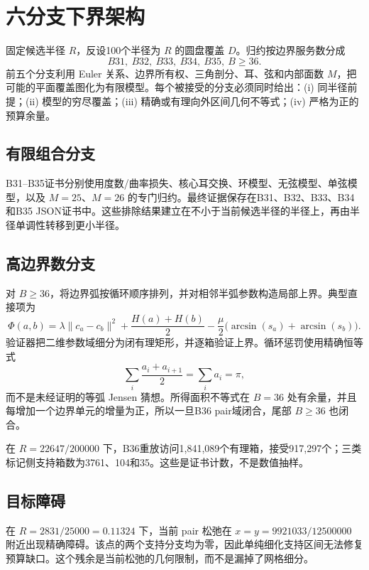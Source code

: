 \section{六分支下界架构}
固定候选半径 $R$，反设100个半径为 $R$ 的圆盘覆盖 $D$。归约按边界服务数分成
\[
B31,\ B32,\ B33,\ B34,\ B35,\ B\ge36.
\]
前五个分支利用 Euler 关系、边界所有权、三角剖分、耳、弦和内部面数 $M$，把可能的平面覆盖图化为有限模型。每个被接受的分支必须同时给出：(i) 同半径前提；(ii) 模型的穷尽覆盖；(iii) 精确或有理向外区间几何不等式；(iv) 严格为正的预算余量。

\subsection{有限组合分支}
B31--B35证书分别使用度数/曲率损失、核心耳交换、环模型、无弦模型、单弦模型，以及 $M=25$、$M=26$ 的专门归约。最终证据保存在B31、B32、B33、B34和B35 JSON证书中。这些排除结果建立在不小于当前候选半径的半径上，再由半径单调性转移到更小半径。

\subsection{高边界数分支}
对 $B\ge36$，将边界弧按循环顺序排列，并对相邻半弧参数构造局部上界。典型直接项为
\[
\Phi(a,b)=\lambda\lVert c_a-c_b\rVert^2+\frac{H(a)+H(b)}2
-\frac\mu2\bigl(\arcsin(s_a)+\arcsin(s_b)\bigr).
\]
验证器把二维参数域细分为闭有理矩形，并逐箱验证上界。循环惩罚使用精确恒等式
\[
\sum_i\frac{a_i+a_{i+1}}2=\sum_i a_i=\pi,
\]
而不是未经证明的等弧 Jensen 猜想。所得面积不等式在 $B=36$ 处有余量，并且每增加一个边界单元的增量为正，所以一旦B36 pair域闭合，尾部 $B\ge36$ 也闭合。

在 $R=22647/200000$ 下，B36重放访问1,841,089个有理箱，接受917,297个；三类标记侧支持箱数为3761、104和35。这些是证书计数，不是数值抽样。

\subsection{目标障碍}
在 $R=2831/25000=0.11324$ 下，当前 pair 松弛在 $x=y=9921033/12500000$ 附近出现精确障碍。该点的两个支持分支均为零，因此单纯细化支持区间无法修复预算缺口。这个残余是当前松弛的几何限制，而不是漏掉了网格细分。
